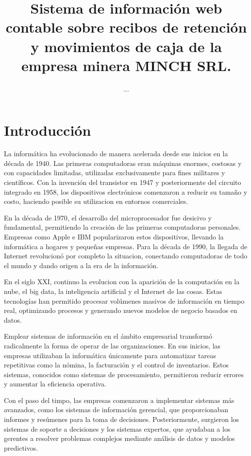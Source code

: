 \documentclass[stu]{apa7}
\title{Sistema de información web contable sobre recibos de retención y movimientos de caja de la empresa minera MINCH SRL.}
\author{...}
\affiliation{...}
\begin{document}
\maketitle

\section{Introducción}

La informática ha evolucionado de manera acelerada desde sus inicios en la década de 1940. Las primeras computadoras eran máquinas enormes, costosas y con capacidades limitadas, utilizadas exclusivamente para fines militares y científicos. Con la invención del transistor en 1947 y posteriormente del circuito integrado en 1958, los dispositivos electrónicos comenzaron a reducir su tamaño y costo, haciendo posible su utilizacion en entornos comerciales.

En la década de 1970, el desarrollo del microprocesador fue desicivo y fundamental, permitiendo la creación de las primeras computadoras personales. Empresas como Apple e IBM popularizaron estos dispositivos, llevando la informática a hogares y pequeñas empresas. Para la década de 1990, la llegada de Internet revolucionó por completo la situacion, conectando computadoras de todo el mundo y dando origen a la era de la información.

En el siglo XXI, continuo la evolucion con la aparición de la computación en la nube, el big data, la inteligencia artificial y el Internet de las cosas. Estas tecnologías han permitido procesar volúmenes masivos de información en tiempo real, optimizando procesos y generando nuevos modelos de negocio basados en datos.

Emplear sistemas de información en el ámbito empresarial transformó radicalmente la forma de operar de las organizaciones. En sus inicios, las empresas utilizaban la informática únicamente para automatizar tareas repetitivas como la nómina, la facturación y el control de inventarios. Estos sistemas, conocidos como sistemas de procesamiento, permitieron reducir errores y aumentar la eficiencia operativa.

Con el paso del timpo, las empresas comenzaron a implementar sistemas más avanzados, como los sistemas de información gerencial, que proporcionaban informes y resúmenes para la toma de decisiones. Posteriormente, surgieron los sistemas de soporte a decisiones y los sistemas expertos, que ayudaban a los gerentes a resolver problemas complejos mediante análisis de datos y modelos predictivos.
\end{document}
